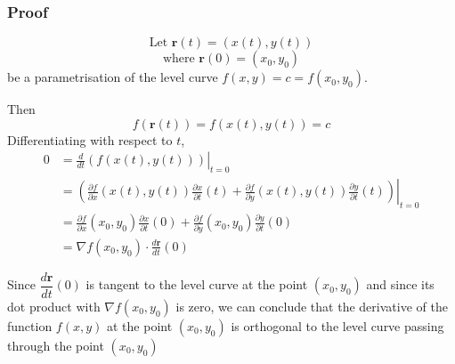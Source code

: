 \documentclass[11pt]{article}
\renewcommand{\vec}[1]{\mathbf{#1}}
\begin{document}
\subsubsection{Proof}
\[ \text{Let } \vec{r}(t) = (x(t), y(t)) \]
\[ \text{where } \vec{r}(0) = (x_0, y_0) \]
be a parametrisation of the level curve $f(x, y) = c = f(x_0, y_0)$.

Then
\[ f(\vec{r}(t)) = f(x(t), y(t)) = c \]
Differentiating with respect to $t$,
\begin{align*}
0 &= \left. \frac{d}{dt} \left( f(x(t), y(t)) \right) \right|_{t=0} \\
&= \left. \left( \frac{\partial f}{\partial x} (x(t), y(t)) \frac{\partial x}{\partial t}(t) + \frac{\partial f}{\partial y}(x(t), y(t)) \frac{\partial y}{\partial t}(t) \right) \right|_{t=0} \\
&= \frac{\partial f}{\partial x} (x_0, y_0) \frac{\partial x}{\partial t}(0) + \frac{\partial f}{\partial y}(x_0, y_0) \frac{\partial y}{\partial t}(0) \\
&= \nabla f(x_0, y_0) \cdot \frac{d\vec{r}}{dt}(0)
\end{align*}

Since $\dfrac{d\vec{r}}{dt}(0)$ is tangent to the level curve at the point $(x_0, y_0)$ and since its dot product with $\nabla f(x_0, y_0)$ is zero, we can conclude that the derivative of the function $f(x, y)$ at the point $(x_0, y_0)$ is orthogonal to the level curve passing through the point $(x_0, y_0)$
\end{document}
